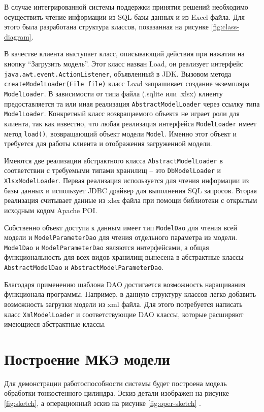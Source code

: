 \documentclass[14pt,oneside,final]{extreport}
\begin{document}
	
	В случае интегрированной системы поддержки принятия решений необходимо осуществить чтение информации из SQL базы данных и из Excel файла. Для этого была разработана структура классов, показанная на рисунке \ref{fig:class-diagram}.
	
	В качестве клиента выступает класс, описывающий действия при нажатии на кнопку ``Загрузить модель''. Этот класс назван Load, он реализует интерфейс \texttt{java.awt.event.ActionListener}, объявленный в JDK. Вызовом метода \texttt{createModelLoader(File file)} класс Load запрашивает создание экземпляра \texttt{ModelLoader}. В зависимости от типа файла (.sqlite или .xlsx) клиенту предоставляется та или иная реализация \texttt{AbstractModelLoader} через ссылку типа \texttt{ModelLoader}. Конкретный класс возвращаемого объекта не играет роли для клиента, так как известно, что любая реализация интерфейса \texttt{ModelLoader} имеет метод \texttt{load()}, возвращающий объект модели \texttt{Model}. Именно этот объект и требуется для работы клиента и отображения загруженной модели. 
	
	Имеются две реализации абстрактного класса \texttt{AbstractModelLoader} в соответствии с требуемыми типами хранилищ -- это \texttt{DbModelLoader} и \texttt{XlsxModelLoader}. Первая реализация используется для чтения информации из базы данных и использует JDBC драйвер для выполнения SQL запросов. Вторая реализация считывает данные из xlsx файла при помощи библиотеки с открытым исходным кодом Apache POI. 
	
	Собственно объект доступа к данным имеет тип \texttt{ModelDao} для чтения всей модели и \texttt{ModelParameterDao} для чтения отдельного параметра из модели. \texttt{ModelDao} и \texttt{ModelParameterDao} являются интерфейсами, а общая функциональность для всех видов хранилищ вынесена в абстрактные классы \texttt{AbstractModelDao} и \texttt{AbstractModelParameterDao}.  
	
	Благодаря применению шаблона DAO достигается возможность наращивания функционала программы. Например, в данную структуру классов легко добавить возможность загрузки модели из xml файла. Для этого потребуется написать класс \texttt{XmlModelLoader} и соответствующие DAO классы, которые расширяют имеющиеся абстрактные классы. 
	
	\section{Построение МКЭ модели}
	Для демонстрации работоспособности системы будет построена модель обработки тонкостенного цилиндра.  Эскиз детали изображен на рисунке \ref{fig:sketch}, а операционный эскиз на рисунке \ref{fig:oper-sketch} .
	
\end{document}
